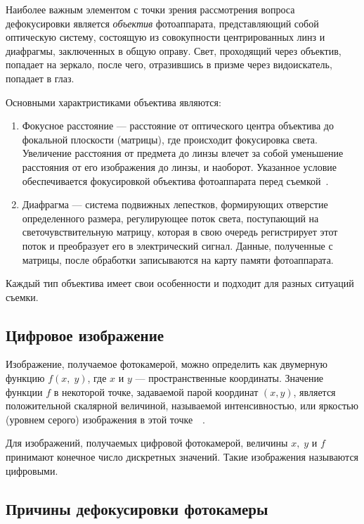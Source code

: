 Наиболее важным элементом с точки зрения рассмотрения вопроса дефокусировки является \textit{объектив} фотоаппарата, представляющий собой оптическую систему, состоящую из совокупности центрированных линз и диафрагмы, заключенных в общую оправу. Свет, проходящий через объектив, попадает на зеркало, после чего, отразившись в призме через видоискатель, попадает в глаз.

Основными характристиками объектива являются:

\begin{enumerate}
	\item Фокусное расстояние --- расстояние от оптического центра объектива до фокальной плоскости (матрицы), где происходит фокусировка света. Увеличение расстояния от предмета до линзы влечет за собой уменьшение расстояния от его изображения до линзы, и наоборот. Указанное условие обеспечивается фокусировкой объектива фотоаппарата перед съемкой~\cite{obj}.
	\item Диафрагма --- система подвижных лепестков, формирующих отверстие определенного размера, регулирующее поток света, поступающий на светочувствительную матрицу, которая в свою очередь регистрирует этот поток и преобразует его в электрический сигнал. Данные, полученные с матрицы, после обработки записываются на карту памяти фотоаппарата.
\end{enumerate}

Каждый тип объектива имеет свои особенности и подходит для разных ситуаций съемки.

\subsection{Цифровое изображение}

Изображение, получаемое фотокамерой, можно определить как двумерную функцию $f(x,\;y)$, где $x$ и $y$ --- пространственные координаты. Значение функции $f$ в некоторой точке, задаваемой парой координат $(x, y)$, является положительной скалярной величиной, называемой интенсивностью, или яркостью (уровнем серого) изображения в этой точке~\cite{digital_pic}~\cite{digit_pic}.

Для изображений, получаемых цифровой фотокамерой, величины $x,\;y$ и $f$ принимают конечное число дискретных значений. Такие изображения называются цифровыми.

\clearpage

\subsection{Причины дефокусировки фотокамеры}


